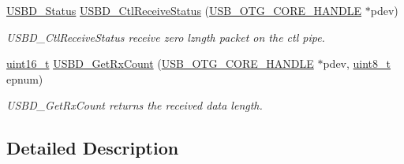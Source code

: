 \begin{DoxyCompactItemize}
\hyperlink{group___u_s_b_d___c_o_r_e___exported___defines_ga1c59ec10075b576176aa51c9ef4e9fc4}{U\-S\-B\-D\-\_\-\-Status} \hyperlink{group___u_s_b_d___i_o_r_e_q___exported___functions_prototype_ga3f68d233a13eff4db77d2d50a656b1f1}{U\-S\-B\-D\-\_\-\-Ctl\-Receive\-Status} (\hyperlink{group___u_s_b___c_o_r_e___exported___types_gaf76054c11eb8a3367907aad7ae700e80}{U\-S\-B\-\_\-\-O\-T\-G\-\_\-\-C\-O\-R\-E\-\_\-\-H\-A\-N\-D\-L\-E} $\ast$pdev)
\begin{DoxyCompactList}\small\item\em U\-S\-B\-D\-\_\-\-Ctl\-Receive\-Status receive zero lzngth packet on the ctl pipe. \end{DoxyCompactList}\item 
\hyperlink{stdint_8h_a273cf69d639a59973b6019625df33e30}{uint16\-\_\-t} \hyperlink{group___u_s_b_d___i_o_r_e_q___exported___functions_prototype_ga4ab150fdd9c6f505341fb6d7ba4da1cd}{U\-S\-B\-D\-\_\-\-Get\-Rx\-Count} (\hyperlink{group___u_s_b___c_o_r_e___exported___types_gaf76054c11eb8a3367907aad7ae700e80}{U\-S\-B\-\_\-\-O\-T\-G\-\_\-\-C\-O\-R\-E\-\_\-\-H\-A\-N\-D\-L\-E} $\ast$pdev, \hyperlink{stdint_8h_aba7bc1797add20fe3efdf37ced1182c5}{uint8\-\_\-t} epnum)
\begin{DoxyCompactList}\small\item\em U\-S\-B\-D\-\_\-\-Get\-Rx\-Count returns the received data length. \end{DoxyCompactList}\end{DoxyCompactItemize}


\subsection{Detailed Description}


